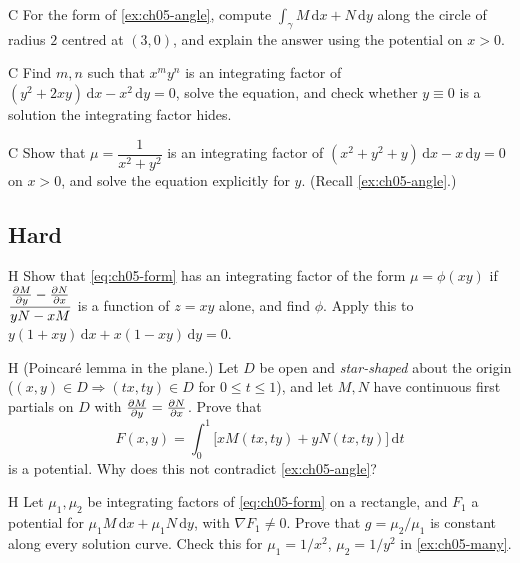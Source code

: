 \begin{problem}{C}\label{prob:ch05-c6}
For the form of \cref{ex:ch05-angle}, compute $\int_\gamma M\,\mathrm{d}x + N\,\mathrm{d}y$
along the circle of radius $2$ centred at $(3,0)$, and explain the answer using
the potential on $x>0$.
\end{problem}

\begin{problem}{C}\label{prob:ch05-c7}
Find $m, n$ such that $x^my^n$ is an integrating factor of
$(y^2 + 2xy)\,\mathrm{d}x - x^2\,\mathrm{d}y = 0$, solve the equation, and check
whether $y\equiv0$ is a solution the integrating factor hides.
\end{problem}

\begin{problem}{C}\label{prob:ch05-c8}
Show that $\mu = \dfrac{1}{x^2+y^2}$ is an integrating factor of
$(x^2 + y^2 + y)\,\mathrm{d}x - x\,\mathrm{d}y = 0$ on $x>0$, and solve the
equation explicitly for $y$. (Recall \cref{ex:ch05-angle}.)
\end{problem}

\subsection*{Hard}

\begin{problem}{H}\label{prob:ch05-h1}
Show that \eqref{eq:ch05-form} has an integrating factor of the form
$\mu = \phi(xy)$ if $\dfrac{\frac{\partial M}{\partial y} - \frac{\partial N}{\partial x}}{yN - xM}$ is a function of
$z = xy$ alone, and find $\phi$. Apply this to
$y(1 + xy)\,\mathrm{d}x + x(1 - xy)\,\mathrm{d}y = 0$.
\end{problem}

\begin{problem}{H}\label{prob:ch05-h2}
(Poincar\'e lemma in the plane.) Let $D$ be open and \emph{star-shaped} about
the origin ($(x,y)\in D\Rightarrow (tx,ty)\in D$ for $0\le t\le1$), and let
$M, N$ have continuous first partials on $D$ with $\frac{\partial M}{\partial y} = \frac{\partial N}{\partial x}$.
Prove that
\[
  F(x,y) = \int_0^1\bigl[xM(tx,ty) + yN(tx,ty)\bigr]\,\mathrm{d}t
\]
is a potential. Why does this not contradict \cref{ex:ch05-angle}?
\end{problem}

\begin{problem}{H}\label{prob:ch05-h3}
Let $\mu_1,\mu_2$ be integrating factors of \eqref{eq:ch05-form} on a rectangle,
and $F_1$ a potential for $\mu_1M\,\mathrm{d}x + \mu_1N\,\mathrm{d}y$, with
$\nabla F_1\neq 0$. Prove that $g = \mu_2/\mu_1$ is constant along every
solution curve. Check this for $\mu_1 = 1/x^2$, $\mu_2 = 1/y^2$ in
\cref{ex:ch05-many}.
\end{problem}


